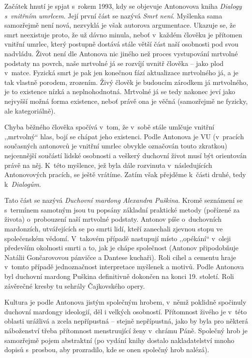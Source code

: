 \begin{pairs}
\begin{Rightside}
\pstart
Začátek hnutí je spjat s~rokem 1993, kdy se objevuje Antonovova kniha \textit{Dialogy s~vnitřním umrlcem}. Její první část se nazývá \textit{Smrt není}. Myšlenka sama samozřejmě není nová, nezvyklá je však autorova argumentace. Ukazuje se, že smrt neexistuje proto, že už dávno minula, neboť v~každém člověku je přítomen vnitřní umrlec, který postupně dostává stále větší část naší osobnosti pod svou nadvládu. Život není dle Antonova nic jiného než proces vystupování mrtvolné podstaty na povrch, naše mrtvolné já se rozvíjí uvnitř člověka -- jako plod v~matce. Fyzická smrt je pak jen konečnou fází aktualizace mrtvolného já, a je tak vlastně porodem, zrozením. Živý člověk je budoucím zárodkem já mrtvolného, je to existence nízká a neplnohodnotná. Mrtvolné já se tedy nakonec jeví jako nejvyšší možná forma existence, neboť právě ona je věčná (samozřejmě ne fyzicky, ale kategoriálně).
\pend

\pstart
Chyba běžného člověka spočívá v~tom, že v~sobě stále umlčuje vnitřní ,,mrtvolný`` hlas, bojí se chápat jeho existenci. Podle Antonova je VU (v~pracích současných antonovců je vnitřní umrlec obvykle označován touto zkratkou) nejcennější součástí lidské osobnosti a veškerý duchovní život musí být orientován právě na něj. K~této myšlence, jež byla dále rozvinuta v~následujících Antonovových pracích, se ještě vrátíme. Zatím však přejděme k~části druhé, tedy k~\textit{Dialogům}.
\pend

\pstart
Tato část se nazývá \textit{Duchovní mardong Alexandra Puškina}. Kromě seznámení se s~termínem samotným jsou tu popsány základní praktické metody (pořízené za života) o~probouzení naší mrtvolné podstaty. Antonov píše o~duchovních mardonzích, utvářejících se po smrti lidí, kteří zanechali zjevnou stopu ve společenském vědomí. V~takovém případě nastupují místo ,,opékání`` v~oleji především okolnosti smrti a to, jak je chápe společnost (Antonov připodobňuje Natálii Gončarovovou pánvičce a Dantese kuchaři). Roli cihel a cementu hraje v~tomto případě jednoznačnost interpretace myšlenek a motivů. Podle Antonova byl duchovní mardong Puškina definitivně dokončen na konci 19. století. Roli závěrečné kresby tu sehrály Čajkovského opery. 
\pend

\pstart
Kultura je podle Antonova jistým společným hrobem, v~němž poklidně spočinuly duchovní mardongy ideologií, děl i velkých osobností. Přítomnost živého je v~této oblasti urážlivá a zcela nepřípustná -- stejně nepřípustná, jako by byla pro některá náboženství třeba přítomnost menstruující ženy v~chrámu Páně. Společný hrob je samozřejmě pojem abstraktní (po vydání knihy dostalo nakladatelství mnoho dopisů s~prosbou, aby prozradilo, kde se onen společný hrob nalézá).
\pend


\end{Rightside}
\end{pairs}
